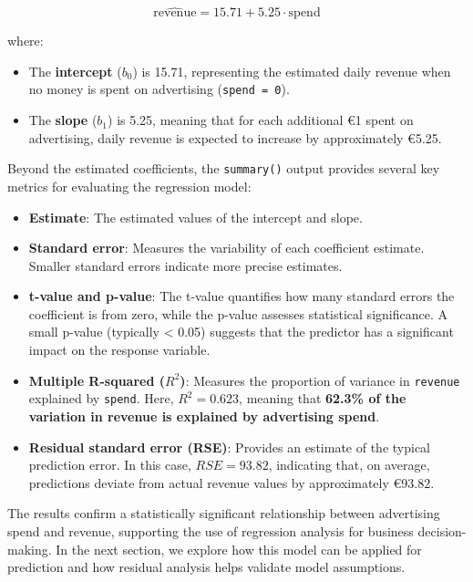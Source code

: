 \documentclass[
  11pt,
]{book}
\providecommand{\tightlist}{%
  \setlength{\itemsep}{0pt}\setlength{\parskip}{0pt}}
\theoremstyle{definition}
\theoremstyle{definition}
\theoremstyle{definition}
\theoremstyle{definition}
\theoremstyle{remark}
\begin{document}
\[
\hat{\text{revenue}} = 15.71 + 5.25 \cdot \text{spend}
\]

where:

\begin{itemize}
\tightlist
\item
  The \textbf{intercept} (\(b_0\)) is 15.71, representing the estimated daily revenue when no money is spent on advertising (\texttt{spend\ =\ 0}).\\
\item
  The \textbf{slope} (\(b_1\)) is 5.25, meaning that for each additional €1 spent on advertising, daily revenue is expected to increase by approximately €5.25.
\end{itemize}

Beyond the estimated coefficients, the \texttt{summary()} output provides several key metrics for evaluating the regression model:

\begin{itemize}
\tightlist
\item
  \textbf{Estimate}: The estimated values of the intercept and slope.\\
\item
  \textbf{Standard error}: Measures the variability of each coefficient estimate. Smaller standard errors indicate more precise estimates.\\
\item
  \textbf{t-value and p-value}: The t-value quantifies how many standard errors the coefficient is from zero, while the p-value assesses statistical significance. A small p-value (typically \textless{} 0.05) suggests that the predictor has a significant impact on the response variable.\\
\item
  \textbf{Multiple R-squared (\(R^2\))}: Measures the proportion of variance in \texttt{revenue} explained by \texttt{spend}. Here, \(R^2 = 0.623\), meaning that \textbf{62.3\% of the variation in revenue is explained by advertising spend}.\\
\item
  \textbf{Residual standard error (RSE)}: Provides an estimate of the typical prediction error. In this case, \(RSE = 93.82\), indicating that, on average, predictions deviate from actual revenue values by approximately €93.82.
\end{itemize}

The results confirm a statistically significant relationship between advertising spend and revenue, supporting the use of regression analysis for business decision-making. In the next section, we explore how this model can be applied for prediction and how residual analysis helps validate model assumptions.
\end{document}
